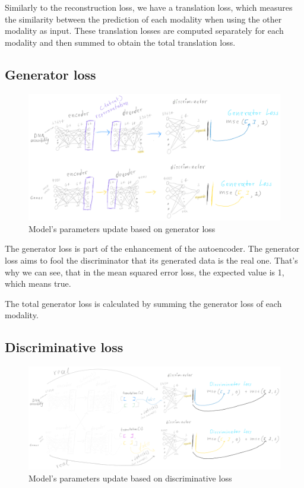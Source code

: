 \documentclass[12pt, a4paper]{article}
\begin{document}
Similarly to the reconstruction loss, we have a translation loss, which measures the similarity between the prediction of each modality when using the other modality as input. These translation losses are computed separately for each modality and then summed to obtain the total translation loss.

\clearpage


\subsection{Generator loss}
\label{sec:generatorloss}

\begin{figure}[h!]
  \centering
  \includegraphics[width=\textwidth]{generator_loss.png}
  \caption{Model's parameters update based on generator loss}
\end{figure}

The generator loss is part of the enhancement of the autoencoder. The generator loss aims to fool the discriminator that its generated data is the real one. That's why we can see, that in the mean squared error loss, the expected value is 1, which means true.

The total generator loss is calculated by summing the generator loss of each modality.

\clearpage

\subsection{Discriminative loss}
\label{sec:discriminativeloss}

\begin{figure}[h!]
  \centering
  \includegraphics[width=\textwidth]{discriminator_loss.png}
  \caption{Model's parameters update based on discriminative loss}
\end{figure}
\end{document}

